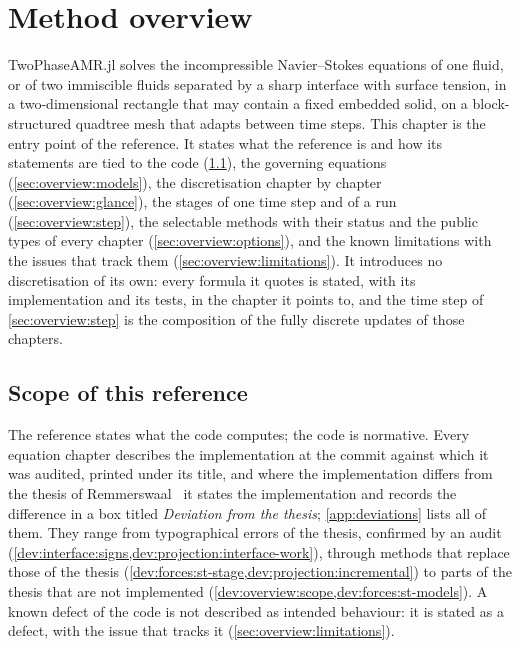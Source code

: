 \chapter{Method overview}\label{ch:overview}
TwoPhaseAMR.jl solves the incompressible Navier--Stokes equations of one
fluid, or of two immiscible fluids separated by a sharp interface with
surface tension, in a two-dimensional rectangle that may contain a fixed
embedded solid, on a block-structured quadtree mesh that adapts between time
steps. This chapter is the entry point of the reference. It states what the
reference is and how its statements are tied to the code
(\cref{sec:overview:scope}), the governing equations
(\cref{sec:overview:models}), the discretisation chapter by chapter
(\cref{sec:overview:glance}), the stages of one time step and of a run
(\cref{sec:overview:step}), the selectable methods with their status and the
public types of every chapter (\cref{sec:overview:options}), and the known
limitations with the issues that track them
(\cref{sec:overview:limitations}). It introduces no discretisation of its
own: every formula it quotes is stated, with its implementation and its
tests, in the chapter it points to, and the time step
of \cref{sec:overview:step} is the composition of the fully discrete updates
of those chapters.

\section{Scope of this reference}\label{sec:overview:scope}
The reference states what the code computes; the code is normative. Every
equation chapter describes the implementation at the commit against which it
was audited, printed under its title, and where the implementation differs from
the thesis of Remmerswaal~\cite{remmerswaal2023} it states the
implementation and records the difference in a box titled \emph{Deviation
from the thesis}; \cref{app:deviations} lists all of them. They range from
typographical errors of the thesis, confirmed by an audit
(\cref{dev:interface:signs,dev:projection:interface-work}), through methods
that replace those of the thesis
(\cref{dev:forces:st-stage,dev:projection:incremental}) to parts of the
thesis that are not implemented (\cref{dev:overview:scope,dev:forces:st-models}).
A known defect of the code is not described as intended behaviour: it is
stated as a defect, with the issue that tracks it
(\cref{sec:overview:limitations}).

